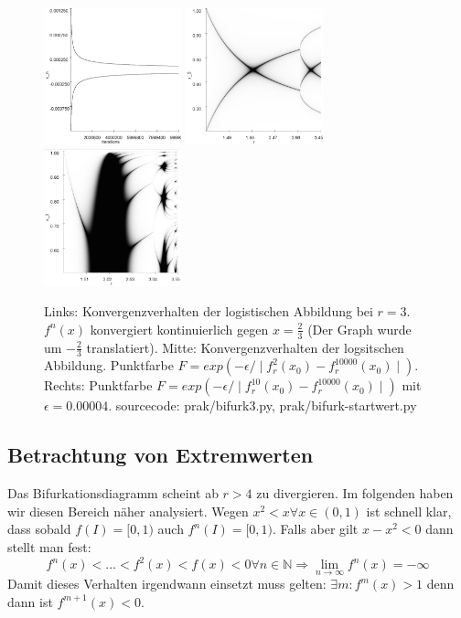 \documentclass{scrartcl}
\begin{document}
\begin{figure}
\centering
\includegraphics[height=150px]{bifurkpunkt}
\includegraphics[height=150px]{startwert/e0008n2}
\includegraphics[height=150px]{startwert/zoomed10}
\caption{Links: Konvergenzverhalten der logistischen Abbildung bei $r=3$. $f^n(x)$ konvergiert kontinuierlich gegen $x=\frac{2}{3}$ (Der Graph wurde um $-\frac{2}{3}$ translatiert). Mitte: Konvergenzverhalten der logsitschen Abbildung. Punktfarbe $F=exp(-\epsilon / \mid f^{2}_r(x_0)-f^{10000}_r(x_0) \mid)$. Rechts: Punktfarbe $F=exp(-\epsilon / \mid f^{10}_r(x_0)-f^{10000}_r(x_0) \mid)$ mit $\epsilon=0.00004$. sourcecode: prak/bifurk3.py, prak/bifurk-startwert.py}
\label{fig:log-konv1}
\end{figure}
\subsection{Betrachtung von Extremwerten}
Das Bifurkationsdiagramm scheint ab $r>4$ zu divergieren. Im folgenden haben wir diesen Bereich näher analysiert. 
Wegen  $x^2 < x \forall x \in (0,1)$ ist schnell klar, dass sobald $f(I) = [0,1)$ auch $f^n(I) = [0, 1)$. 
Falls aber gilt $x-x^2 < 0$ dann stellt man fest:
\begin{equation}
f^n(x) < ... < f^{2}(x) < f(x) < 0 \forall n \in \mathbb{N} \Rightarrow \lim_{n \rightarrow \infty} f^n(x) = -\infty
\end{equation}
Damit dieses Verhalten irgendwann einsetzt muss gelten: $\exists m: f^m(x) > 1$ denn dann ist $f^{m+1}(x) < 0$. 
\end{document}
